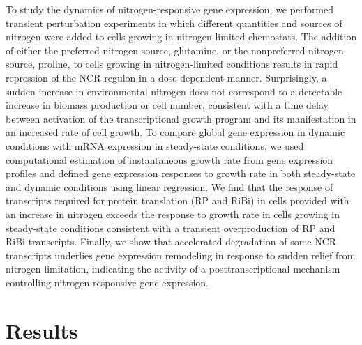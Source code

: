 To study the dynamics of
nitrogen-responsive gene expression, we performed transient
perturbation experiments in which different quantities and sources of
nitrogen were added to cells growing in nitrogen-limited chemostats.
The addition of either the preferred nitrogen source, glutamine, or
the nonpreferred nitrogen source, proline, to cells growing in
nitrogen-limited conditions results in rapid repression of the NCR
regulon in a dose-dependent manner. Surprisingly, a sudden increase in
environmental nitrogen does not correspond to a detectable increase in
biomass production or cell number, consistent with a time delay
between activation of the transcriptional growth program and its
manifestation in an increased rate of cell growth. To compare global
gene expression in dynamic conditions with mRNA expression in
steady-state conditions, we used computational estimation of
instantaneous growth rate from gene expression profiles 
\parencite{brauer2008coordination,airoldi2009predicting} 
and defined gene expression responses to
growth rate in both steady-state and dynamic conditions using linear
regression. We find that the response of transcripts required for
protein translation (RP and RiBi) in cells provided with an increase
in nitrogen exceeds the response to growth rate in cells growing in
steady-state conditions consistent with a transient overproduction of
RP and RiBi transcripts. Finally, we show that accelerated degradation
of some NCR transcripts underlies gene expression remodeling in
response to sudden relief from nitrogen limitation, indicating the
activity of a posttranscriptional mechanism controlling
nitrogen-responsive gene expression.  

\section{Results} 

